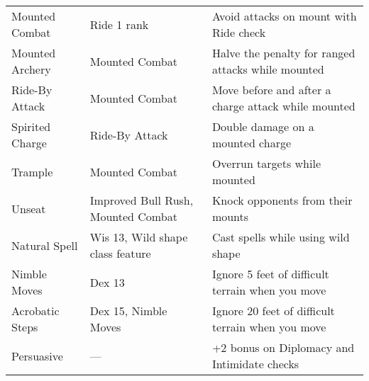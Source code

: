 \begin{table*}
\begin{tabularx}{\linewidth}{lXl}
Mounted Combat & Ride 1 rank & Avoid attacks on mount with Ride check\\
\enspace Mounted Archery & Mounted Combat & Halve the penalty for ranged attacks while mounted\\
\enspace Ride-By Attack & Mounted Combat & Move before and after a charge attack while mounted\\
\enspace \enspace Spirited Charge & Ride-By Attack & Double damage on a mounted charge\\
\enspace Trample & Mounted Combat & Overrun targets while mounted\\
\enspace Unseat & Improved Bull Rush, Mounted Combat & Knock opponents from their mounts\\
Natural Spell & Wis 13, Wild shape class feature & Cast spells while using wild shape\\
Nimble Moves & Dex 13 & Ignore 5 feet of difficult terrain when you move\\
\enspace Acrobatic Steps & Dex 15, Nimble Moves & Ignore 20 feet of difficult terrain when you move\\
Persuasive & --- &  +2 bonus on Diplomacy and Intimidate checks\\
\end{tabularx}
\end{table*}
